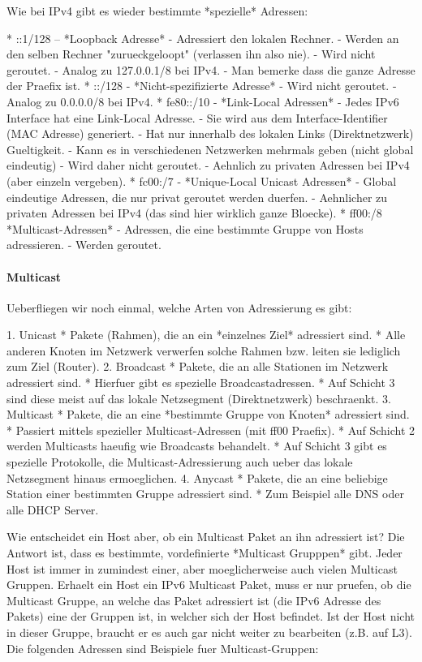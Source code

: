Wie bei IPv4 gibt es wieder bestimmte *spezielle* Adressen:

* ::1/128 -- *Loopback Adresse*
  - Adressiert den lokalen Rechner.
  - Werden an den selben Rechner "zurueckgeloopt" (verlassen ihn also nie).
  - Wird nicht geroutet.
  - Analog zu 127.0.0.1/8 bei IPv4.
  - Man bemerke dass die ganze Adresse der Praefix ist.
* ::/128 - *Nicht-spezifizierte Adresse*
  - Wird nicht geroutet.
  - Analog zu 0.0.0.0/8 bei IPv4.
* fe80::/10 - *Link-Local Adressen*
  - Jedes IPv6 Interface hat eine Link-Local Adresse.
  - Sie wird aus dem Interface-Identifier (MAC Adresse) generiert.
  - Hat nur innerhalb des lokalen Links (Direktnetzwerk) Gueltigkeit.
  - Kann es in verschiedenen Netzwerken mehrmals geben (nicht global eindeutig)
  - Wird daher nicht geroutet.
  - Aehnlich zu privaten Adressen bei IPv4 (aber einzeln vergeben).
* fc00:/7 - *Unique-Local Unicast Adressen*
  - Global eindeutige Adressen, die nur privat geroutet werden duerfen.
  - Aehnlicher zu privaten Adressen bei IPv4 (das sind hier wirklich ganze Bloecke).
* ff00:/8 *Multicast-Adressen*
  - Adressen, die eine bestimmte Gruppe von Hosts adressieren.
  - Werden geroutet.

\paragraph{Multicast} 

Ueberfliegen wir noch einmal, welche Arten von Adressierung es gibt:

1. Unicast
   * Pakete (Rahmen), die an ein *einzelnes Ziel* adressiert sind.
   * Alle anderen Knoten im Netzwerk verwerfen solche Rahmen bzw. leiten sie
     lediglich zum Ziel (Router).
2. Broadcast
   * Pakete, die an alle Stationen im Netzwerk adressiert sind.
   * Hierfuer gibt es spezielle Broadcastadressen.
   * Auf Schicht 3 sind diese meist auf das lokale Netzsegment (Direktnetzwerk)
     beschraenkt.
3. Multicast
   * Pakete, die an eine *bestimmte Gruppe von Knoten* adressiert sind.
   * Passiert mittels spezieller Multicast-Adressen (mit ff00 Praefix).
   * Auf Schicht 2 werden Multicasts haeufig wie Broadcasts behandelt.
   * Auf Schicht 3 gibt es spezielle Protokolle, die Multicast-Adressierung auch
     ueber das lokale Netzsegment hinaus ermoeglichen.
4. Anycast
   * Pakete, die an eine beliebige Station einer bestimmten Gruppe adressiert
     sind.
   * Zum Beispiel alle DNS oder alle DHCP Server.

Wie entscheidet ein Host aber, ob ein Multicast Paket an ihn adressiert ist? Die
Antwort ist, dass es bestimmte, vordefinierte *Multicast Grupppen* gibt. Jeder
Host ist immer in zumindest einer, aber moeglicherweise auch vielen Multicast
Gruppen. Erhaelt ein Host ein IPv6 Multicast Paket, muss er nur pruefen, ob die
Multicast Gruppe, an welche das Paket adressiert ist (die IPv6 Adresse des
Pakets) eine der Gruppen ist, in welcher sich der Host befindet. Ist der Host
nicht in dieser Gruppe, braucht er es auch gar nicht weiter zu bearbeiten
(z.B. auf L3). Die folgenden Adressen sind Beispiele fuer Multicast-Gruppen:


